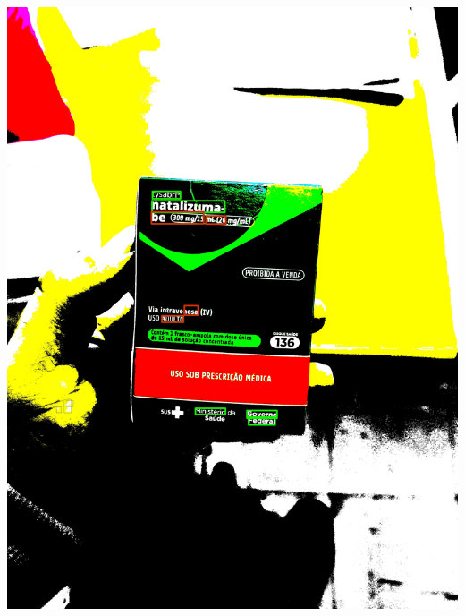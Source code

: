 \begin{frame}
\begin{columns}
\begin{column}{0.24\textwidth}
			\includegraphics[height=0.35\textheight]{../pictures/tysabri_rgb_thresh_recomposed_cmyk_boxes.jpg}
		\end{column}
	\end{columns}
\end{frame}

